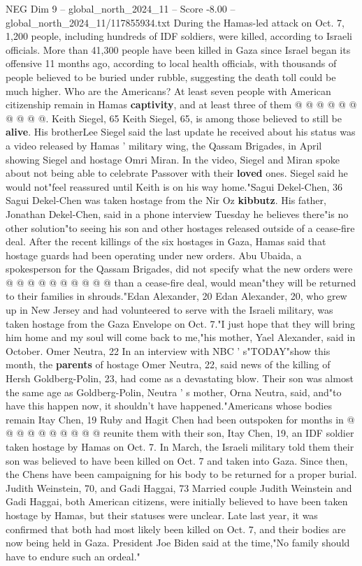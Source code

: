 \begin{textsample}{NEG Dim 9 – global\_north\_2024\_11 – Score -8.00 – global\_north\_2024\_11/117855934.txt}
During the Hamas-led attack on Oct. 7, 1,200 people, including hundreds of IDF soldiers, were killed, according to Israeli officials.
More than 41,300 people have been killed in Gaza since Israel began its offensive 11 months ago, according to local health officials, with thousands of people believed to be buried under rubble, suggesting the death toll could be much higher.
Who are the Americans?
At least seven people with American citizenship remain in Hamas \textbf{captivity}, and at least three of them @ @ @ @ @ @ @ @ @ @.
Keith Siegel, 65 Keith Siegel, 65, is among those believed to still be \textbf{alive}.
His brotherLee Siegel said the last update he received about his status was a video released by Hamas ' military wing, the Qassam Brigades, in April showing Siegel and hostage Omri Miran.
In the video, Siegel and Miran spoke about not being able to celebrate Passover with their \textbf{loved} ones.
Siegel said he would not"feel reassured until Keith is on his way home."Sagui Dekel-Chen, 36 Sagui Dekel-Chen was taken hostage from the Nir Oz \textbf{kibbutz}.
His father, Jonathan Dekel-Chen, said in a phone interview Tuesday he believes there"is no other solution"to seeing his son and other hostages released outside of a cease-fire deal.
After the recent killings of the six hostages in Gaza, Hamas said that hostage guards had been operating under new orders.
Abu Ubaida, a spokesperson for the Qassam Brigades, did not specify what the new orders were @ @ @ @ @ @ @ @ @ @ than a cease-fire deal, would mean"they will be returned to their families in shrouds."Edan Alexander, 20 Edan Alexander, 20, who grew up in New Jersey and had volunteered to serve with the Israeli military, was taken hostage from the Gaza Envelope on Oct. 7."I just hope that they will bring him home and my soul will come back to me,"his mother, Yael Alexander, said in October.
Omer Neutra, 22 In an interview with NBC ' s"TODAY"show this month, the \textbf{parents} of hostage Omer Neutra, 22, said news of the killing of Hersh Goldberg-Polin, 23, had come as a devastating blow.
Their son was almost the same age as Goldberg-Polin, Neutra ' s mother, Orna Neutra, said, and"to have this happen now, it shouldn't have happened."Americans whose bodies remain Itay Chen, 19 Ruby and Hagit Chen had been outspoken for months in @ @ @ @ @ @ @ @ @ @ reunite them with their son, Itay Chen, 19, an IDF soldier taken hostage by Hamas on Oct. 7.
In March, the Israeli military told them their son was believed to have been killed on Oct. 7 and taken into Gaza.
Since then, the Chens have been campaigning for his body to be returned for a proper burial.
Judith Weinstein, 70, and Gadi Haggai, 73 Married couple Judith Weinstein and Gadi Haggai, both American citizens, were initially believed to have been taken hostage by Hamas, but their statuses were unclear.
Late last year, it was confirmed that both had most likely been killed on Oct. 7, and their bodies are now being held in Gaza.
President Joe Biden said at the time,"No family should have to endure such an ordeal."

\end{textsample}
